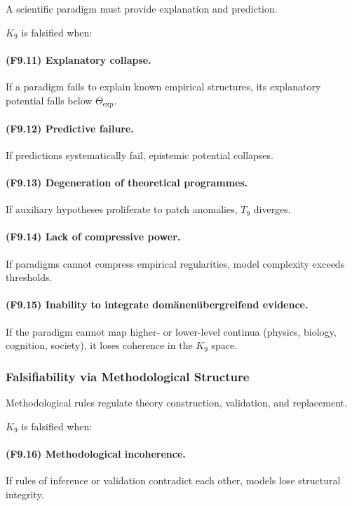A scientific paradigm must provide explanation and prediction.

$K_9$ is falsified when:

\paragraph{(F9.11) Explanatory collapse.}
If a paradigm fails to explain known empirical structures,
its explanatory potential falls below $\Theta_{\mathrm{exp}}$.

\paragraph{(F9.12) Predictive failure.}
If predictions systematically fail,
epistemic potential collapses.

\paragraph{(F9.13) Degeneration of theoretical programmes.}
If auxiliary hypotheses proliferate to patch anomalies,
$T_9$ diverges.

\paragraph{(F9.14) Lack of compressive power.}
If paradigms cannot compress empirical regularities,
model complexity exceeds thresholds.

\paragraph{(F9.15) Inability to integrate domänenübergreifend evidence.}
If the paradigm cannot map higher- or lower-level continua
(physics, biology, cognition, society),
it loses coherence in the $K_9$ space.



\subsubsection{Falsifiability via Methodological Structure}

Methodological rules regulate theory construction, validation,
and replacement.

$K_9$ is falsified when:

\paragraph{(F9.16) Methodological incoherence.}
If rules of inference or validation contradict each other,
models lose structural integrity.

